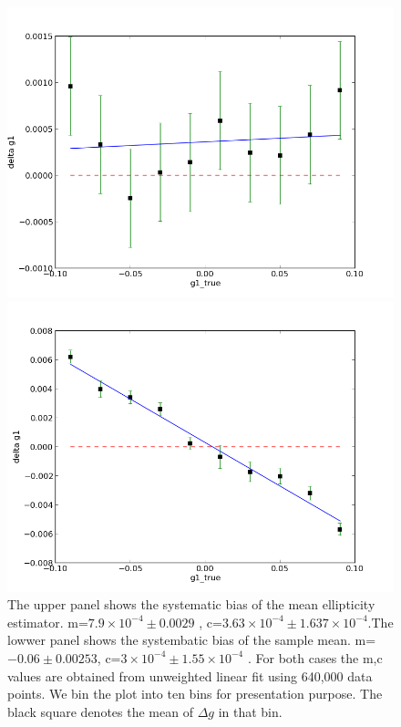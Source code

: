 \documentclass[useAMS,usenatbib]{mn2e}
\begin{document}
\begin{figure}

\includegraphics[scale=0.48]{fig/averagebias}

\includegraphics[scale=0.48]{fig/bayesianbias}

\caption{The upper panel shows the systematic bias of the mean ellipticity
estimator. m=$7.9\times10^{-4}\pm0.0029$ , c=$3.63\times10^{-4}\pm1.637\times10^{-4}$.The
lowwer panel shows the systembatic bias of the sample mean. m=$-0.06\pm0.00253$,
c=$3\times10^{-4}\pm1.55\times10^{-4}$ . For both cases the m,c values
are obtained from unweighted linear fit using 640,000 data points. We bin the plot into ten bins for presentation
purpose. The black square denotes the mean of $\Delta g$ in that
bin.}
\end{figure}
\end{document}
